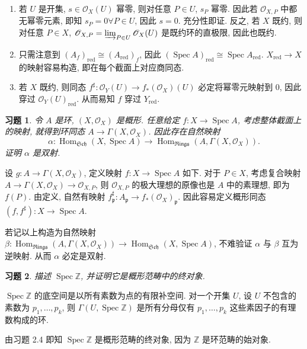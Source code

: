 \documentclass{article}
\theoremstyle{exercise}
\newtheorem{exercise}{习题}[section]
\newenvironment{proofc}{\proof}{\endproof}
\def\gp{\mathfrak{p}}
\def\Z{\mathbb{Z}}
\def\cO{\mathscr{O}}
\def\Sch{\mathfrak{Sch}}
\def\Rings{\mathfrak{Rings}}
\def\red{\mathrm{red}}
\def\Hom{\operatorname{Hom}}
\def\Spec{\operatorname{Spec}}
\begin{document}
\begin{proofc}
  \begin{enumerate}[label={(\alph*)}]
    \item 若 $U$ 是开集, $s \in \cO_X(U)$ 幂零, 则对任意 $P \in U$, $s_P$ 幂零.
          因此若 $\cO_{X, P}$ 中都无幂零元素, 即知 $s_P = 0 \forall P \in U$, 因此 $s = 0$.
          充分性即证.
          反之, 若 $X$ 既约, 则对任意 $P \in X$,
          $\cO_{X, P} = \varinjlim_{P \in U} \cO_X(U)$ 是既约环的直极限, 因此也既约.

    \item 只需注意到 $(A_f)_{\red} \cong (A_{\red})_f$,
          因此 $(\Spec A)_{\red} \cong \Spec A_{\red}$.
          $X_{\red} \to X$ 的映射容易构造, 即在每个截面上对应商同态.

    \item 若 $X$ 既约, 则同态 $f^\sharp \colon \cO_Y(U) \to f_*(\cO_X)(U)$
          必定将幂零元映射到 $0$, 因此穿过 $\cO_Y(U)_{\red}$.
          从而易知 $f$ 穿过 $Y_{\red}$.
          \qedhere
  \end{enumerate}
\end{proofc}

\begin{exercise}
  令 $A$ 是环, $(X, \cO_X)$ 是概形. 任意给定 $f \colon X \to \Spec A$,
  考虑整体截面上的映射, 就得到环同态 $A \to \Gamma(X, \cO_X)$.
  因此存在自然映射
  \[
    \alpha \colon \Hom_{\Sch}(X, \Spec A) \to \Hom_{\Rings}(A, \Gamma(X, \cO_X)).
  \]
  证明 $\alpha$ 是双射.
\end{exercise}

\begin{proofc}
  设 $g \colon A \to \Gamma(X, \cO_X)$, 定义映射 $f \colon X \to \Spec A$ 如下.
  对于 $P \in X$, 考虑复合映射 $A \to \Gamma(X, \cO_X) \to \cO_{X, P}$,
  则 $\cO_{X, P}$ 的极大理想的原像也是 $A$ 中的素理想, 即为 $f(P)$.
  由定义, 自然有映射 $f^\sharp_{\gp} \colon A_{\gp} \to f_*(\cO_X)_{\gp}$.
  因此容易定义概形同态 $(f, f^\sharp) \colon X \to \Spec A$.

  若记以上构造为自然映射
  $\beta \colon \Hom_{\Rings}(A, \Gamma(X, \cO_X)) \to \Hom_{\Sch}(X, \Spec A)$,
  不难验证 $\alpha$ 与 $\beta$ 互为逆映射. 从而 $\alpha$ 必定是双射.
\end{proofc}

\begin{exercise}
  描述 $\Spec \Z$, 并证明它是概形范畴中的终对象.
\end{exercise}

\begin{proofc}
  $\Spec \Z$ 的底空间是以所有素数为点的有限补空间.
  对一个开集 $U$, 设 $U$ 不包含的素数为 $p_1, \dots, p_k$,
  则 $\Gamma(U, \Spec \Z)$ 是所有分母仅有 $p_1, \dots, p_k$ 这些素因子的有理数构成的环.

  由习题 2.4 即知 $\Spec \Z$ 是概形范畴的终对象,
  因为 $\Z$ 是环范畴的始对象.
\end{proofc}
\end{document}
